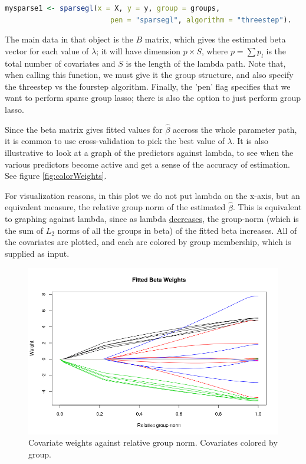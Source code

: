 \documentclass[12pt]{article}
\begin{document}
\begin{lstlisting}[language=R]
mysparse1 <- sparsegl(x = X, y = y, group = groups,
                         pen = "sparsegl", algorithm = "threestep").
\end{lstlisting}
The main data in that object is the $B$ matrix, which gives the estimated beta vector for each value of $\lambda$; it will have dimension $p\times S$, where $p = \sum p_l$ is the total number of covariates and $S$ is the length of the lambda path. Note that, when calling this function, we must give it the group structure, and also specify the threestep vs the fourstep algorithm. Finally, the 'pen' flag specifies that we want to perform sparse group lasso; there is also the option to just perform group lasso.

Since the beta matrix gives fitted values for $\hat{\beta}$ accross the whole parameter path, it is common to use cross-validation to pick the best value of $\lambda$. It is also illustrative to look at a graph of the predictors against lambda, to see when the various predictors become active and get a sense of the accuracy of estimation. See figure  \autoref{fig:colorWeights}.

For visualization reasons, in this plot we do not put lambda on the x-axis, but an equivalent measure, the relative group norm of the estimated $\hat{\beta}$. This is equivalent to graphing against lambda, since as lambda \underline{decreases}, the group-norm (which is the sum of $L_2$ norms of all the groups in beta) of the fitted beta increases. All of the covariates are plotted, and each are colored by group membership, which is supplied as input.


\begin{figure}[tb!]
\centering
\includegraphics[scale=0.5]{fitted_beta_weights.png}
\caption{Covariate weights against relative group norm. Covariates colored by group.}
\label{fig:colorWeights}
\end{figure}
\end{document}
